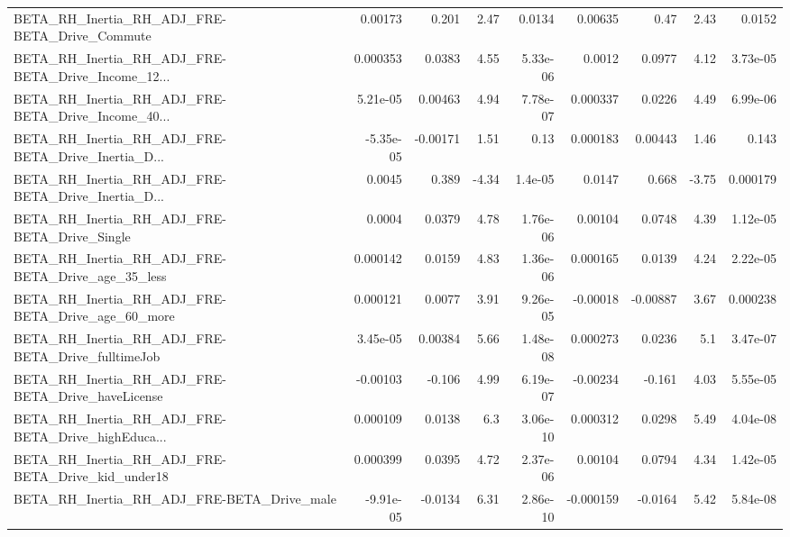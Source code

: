 \begin{tabular}{lrrrrrrrr}
BETA\_RH\_Inertia\_RH\_ADJ\_FRE-BETA\_Drive\_Commute      &     0.00173 &        0.201 &     2.47 &   0.0134 &    0.00635 &        0.47 &         2.43 &        0.0152 \\
BETA\_RH\_Inertia\_RH\_ADJ\_FRE-BETA\_Drive\_Income\_12... &    0.000353 &       0.0383 &     4.55 & 5.33e-06 &     0.0012 &      0.0977 &         4.12 &      3.73e-05 \\
BETA\_RH\_Inertia\_RH\_ADJ\_FRE-BETA\_Drive\_Income\_40... &    5.21e-05 &      0.00463 &     4.94 & 7.78e-07 &   0.000337 &      0.0226 &         4.49 &      6.99e-06 \\
BETA\_RH\_Inertia\_RH\_ADJ\_FRE-BETA\_Drive\_Inertia\_D... &   -5.35e-05 &     -0.00171 &     1.51 &     0.13 &   0.000183 &     0.00443 &         1.46 &         0.143 \\
BETA\_RH\_Inertia\_RH\_ADJ\_FRE-BETA\_Drive\_Inertia\_D... &      0.0045 &        0.389 &    -4.34 &  1.4e-05 &     0.0147 &       0.668 &        -3.75 &      0.000179 \\
BETA\_RH\_Inertia\_RH\_ADJ\_FRE-BETA\_Drive\_Single       &      0.0004 &       0.0379 &     4.78 & 1.76e-06 &    0.00104 &      0.0748 &         4.39 &      1.12e-05 \\
BETA\_RH\_Inertia\_RH\_ADJ\_FRE-BETA\_Drive\_age\_35\_less  &    0.000142 &       0.0159 &     4.83 & 1.36e-06 &   0.000165 &      0.0139 &         4.24 &      2.22e-05 \\
BETA\_RH\_Inertia\_RH\_ADJ\_FRE-BETA\_Drive\_age\_60\_more  &    0.000121 &       0.0077 &     3.91 & 9.26e-05 &   -0.00018 &    -0.00887 &         3.67 &      0.000238 \\
BETA\_RH\_Inertia\_RH\_ADJ\_FRE-BETA\_Drive\_fulltimeJob  &    3.45e-05 &      0.00384 &     5.66 & 1.48e-08 &   0.000273 &      0.0236 &          5.1 &      3.47e-07 \\
BETA\_RH\_Inertia\_RH\_ADJ\_FRE-BETA\_Drive\_haveLicense  &    -0.00103 &       -0.106 &     4.99 & 6.19e-07 &   -0.00234 &      -0.161 &         4.03 &      5.55e-05 \\
BETA\_RH\_Inertia\_RH\_ADJ\_FRE-BETA\_Drive\_highEduca... &    0.000109 &       0.0138 &      6.3 & 3.06e-10 &   0.000312 &      0.0298 &         5.49 &      4.04e-08 \\
BETA\_RH\_Inertia\_RH\_ADJ\_FRE-BETA\_Drive\_kid\_under18  &    0.000399 &       0.0395 &     4.72 & 2.37e-06 &    0.00104 &      0.0794 &         4.34 &      1.42e-05 \\
BETA\_RH\_Inertia\_RH\_ADJ\_FRE-BETA\_Drive\_male         &   -9.91e-05 &      -0.0134 &     6.31 & 2.86e-10 &  -0.000159 &     -0.0164 &         5.42 &      5.84e-08 \\

\end{tabular}
